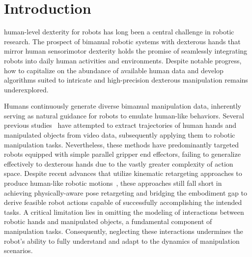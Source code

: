 \section{Introduction}
 human-level dexterity for robots has long been a central challenge in robotic research. The prospect of bimanual robotic systems with dexterous hands that mirror human sensorimotor dexterity holds the promise of seamlessly integrating robots into daily human activities and environments. Despite notable progress, how to capitalize on the abundance of available human data and develop algorithms suited to intricate and high-precision dexterous manipulation remains underexplored. 


Humans continuously generate diverse bimanual manipulation data, inherently serving as natural guidance for robots to emulate human-like behaviors. Several previous studies~\cite{zhou2025you,kim2025uniskill,lum2025crossing,dan2025x,wangmimicplay} have attempted to extract trajectories of human hands and manipulated objects from video data, subsequently applying them to robotic manipulation tasks. Nevertheless, these methods have predominantly targeted robots equipped with simple parallel gripper end effectors, failing to generalize effectively to dexterous hands due to the vastly greater complexity of action space. Despite recent advances that utilize kinematic retargeting approaches to produce human-like robotic motions~\cite{qiu2025humanoid,qin2023anyteleop,yang2025egovla,shaw2024learning,shaw2023videodex}, these approaches still fall short in achieving physically-aware pose retargeting and bridging the embodiment gap to derive feasible robot actions capable of successfully accomplishing the intended tasks. A critical limitation lies in omitting the modeling of interactions between robotic hands and manipulated objects, a fundamental component of manipulation tasks. Consequently, neglecting these interactions undermines the robot's ability to fully understand and adapt to the dynamics of manipulation scenarios.
 

